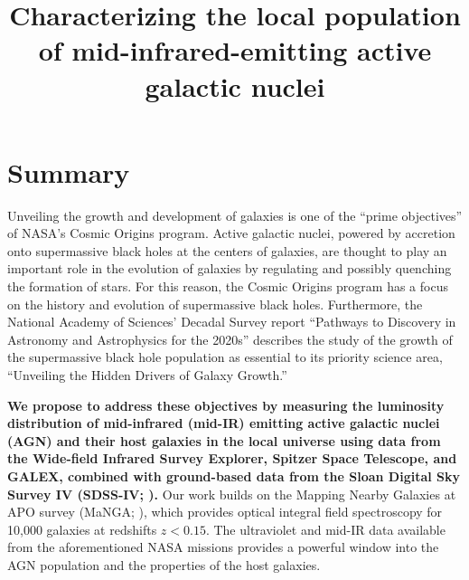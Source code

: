 \documentclass[12pt, preprint]{hacked-aastex}
\begin{document}
\pagestyle{plain}

\newcommand{\imtxt}[1]{\textcolor{red}{#1}}
\newcommand{\imsout}[1]{\textcolor{red}{\sout{#1}}}

\title{{\large Characterizing the local population of mid-infrared-emitting active galactic nuclei}}

\maketitle

\renewcommand{\baselinestretch}{0.75}\normalsize
{\hypersetup{hidelinks} \tableofcontents }
\renewcommand{\baselinestretch}{1.0}\normalsize

\newpage
\section{Summary}\label{sec:summary}

Unveiling the growth and development of galaxies is one of the ``prime
objectives'' of NASA's Cosmic Origins program.  Active galactic
nuclei, powered by accretion onto supermassive black holes at the
centers of galaxies, are thought to play an important role in the
evolution of galaxies by regulating and possibly quenching the
formation of stars.  For this reason, the Cosmic Origins program has a
focus on the history and evolution of supermassive black holes.
Furthermore, the National Academy of Sciences' Decadal Survey report
``Pathways to Discovery in Astronomy and Astrophysics for the 2020s''
describes the study of the growth of the supermassive black hole
population as essential to its priority science area, ``Unveiling the
Hidden Drivers of Galaxy Growth.''

{\bf We propose to address these objectives by measuring the
  luminosity distribution of mid-infrared (mid-IR) emitting active
  galactic nuclei (AGN) and their host galaxies in the local universe
  using data from the Wide-field Infrared Survey Explorer, Spitzer
  Space Telescope, and GALEX, combined with ground-based data from the
  Sloan Digital Sky Survey IV (SDSS-IV; \cite{blanton17a}).}  Our work
builds on the Mapping Nearby Galaxies at APO survey (MaNGA;
\cite{bundy15a}), which provides optical integral field spectroscopy
for 10,000 galaxies at redshifts $z<0.15$.  The ultraviolet and mid-IR
data available from the aforementioned NASA missions provides a
powerful window into the AGN population and the properties of the host
galaxies.
\end{document}
